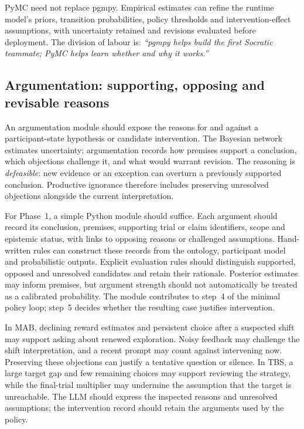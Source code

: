 \documentclass[11pt,a4paper]{article}
\begin{document}
PyMC need not replace pgmpy. Empirical estimates can refine the runtime model's priors, transition probabilities, policy thresholds and intervention-effect assumptions, with uncertainty retained and revisions evaluated before deployment. The division of labour is: \emph{``pgmpy helps build the first Socratic teammate; PyMC helps learn whether and why it works.''}


\subsection{Argumentation: supporting, opposing and revisable reasons}
An argumentation module should expose the reasons for and against a participant-state hypothesis or candidate intervention. The Bayesian network estimates uncertainty; argumentation records how premises support a conclusion, which objections challenge it, and what would warrant revision. The reasoning is \emph{defeasible}: new evidence or an exception can overturn a previously supported conclusion. Productive ignorance therefore includes preserving unresolved objections alongside the current interpretation.

For Phase~1, a simple Python module should suffice. Each argument should record its conclusion, premises, supporting trial or claim identifiers, scope and epistemic status, with links to opposing reasons or challenged assumptions. Hand-written rules can construct these records from the ontology, participant model and probabilistic outputs. Explicit evaluation rules should distinguish supported, opposed and unresolved candidates and retain their rationale. Posterior estimates may inform premises, but argument strength should not automatically be treated as a calibrated probability. The module contributes to step~4 of the minimal policy loop; step~5 decides whether the resulting case justifies intervention.

In MAB, declining reward estimates and persistent choice after a suspected shift may support asking about renewed exploration. Noisy feedback may challenge the shift interpretation, and a recent prompt may count against intervening now. Preserving these objections can justify a tentative question or silence. In TBS, a large target gap and few remaining choices may support reviewing the strategy, while the final-trial multiplier may undermine the assumption that the target is unreachable. The LLM should express the inspected reasons and unresolved assumptions; the intervention record should retain the arguments used by the policy.
\end{document}
